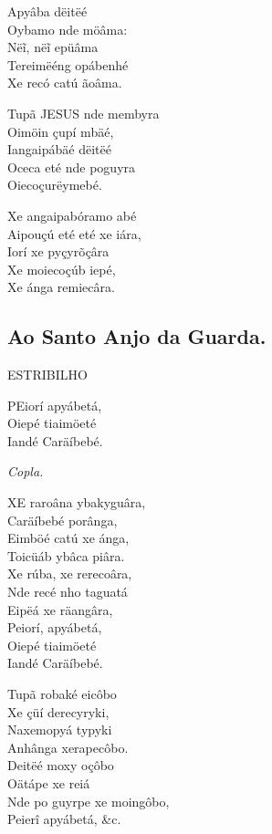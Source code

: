 \documentclass[openany,titlepage,12pt]{book}
\begin{document}
Apyâba dëitëé\\
Oybamo nde möâma:\\
Nëĩ, nëĩ epüâma\\
Tereimëéng opábenhé\\
Xe recó catú ãoâma.

Tupã JESUS nde membyra\\
Oimöin çupí mbäé,\\
Iangaipábäé dëitëé\\
Oceca eté nde poguyra\\
Oiecoçurëymebé.

Xe angaipabóramo abé\\
Aipouçú eté eté xe iára,\\
Iorí xe pyçyrõçâra\\
Xe moiecoçúb iepé,\\
Xe ánga remiecâra.\\%
\newpage

\subsection{Ao Santo Anjo da Guarda.}
\begin{center} 
    ESTRIBILHO
\end{center}
\unskip
\vspace{\baselineskip}
\lettrine[findent =4pt, nindent=0pt, lines=2]
{P}{E}iorí apyábetá,\\
Oiepé tiaimöeté\\
Iandé Caräíbebé.

\begin{center}
    \textit{Copla.}
\end{center}

\lettrine[findent =4pt, nindent=0pt, lines=2]
{X}{E} raroâna ybakyguâra,\\
Caräíbebé porânga,\\
Eimböé catú xe ánga,\\
Toicüáb ybâca piâra.\\
Xe rúba, xe rerecoâra,\\
Nde recé nho taguatá\\
Eipëá xe räangâra,\\
Peiorí, apyábetá,\\
Oiepé tiaimöeté\\
Iandé Caräíbebé.

Tupã robaké eicôbo\\
Xe çüí derecyryki,\\
Naxemopyá typyki\\
Anhânga xerapecôbo.\\
Deitëé moxy oçôbo\\
Oätápe xe reiá\\%
Nde po guyrpe xe moingôbo,\\
Peierî apyábetá, \&c.
\end{document}
